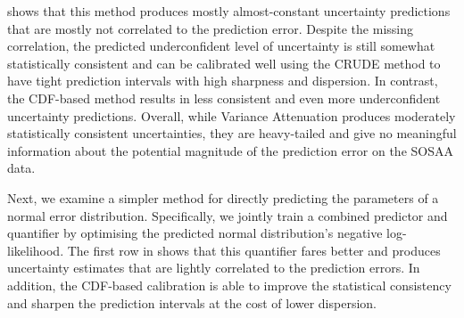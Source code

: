 \noindent {} shows that this method produces mostly almost-constant uncertainty predictions that are mostly not correlated to the prediction error. Despite the missing correlation, the predicted underconfident level of uncertainty is still somewhat statistically consistent and can be calibrated well using the CRUDE method to have tight prediction intervals with high sharpness and dispersion. In contrast, the CDF-based method results in less consistent and even more underconfident uncertainty predictions. Overall, while Variance Attenuation produces moderately statistically consistent uncertainties, they are heavy-tailed and give no meaningful information about the potential magnitude of the prediction error on the SOSAA data.

\newpar Next, we examine a simpler method for directly predicting the parameters of a normal error distribution. Specifically, we jointly train a combined predictor and quantifier by optimising the predicted normal distribution's negative log-likelihood. The first row in  shows that this quantifier fares better and produces uncertainty estimates that are lightly correlated to the prediction errors. In addition, the CDF-based calibration is able to improve the statistical consistency and sharpen the prediction intervals at the cost of lower dispersion.

